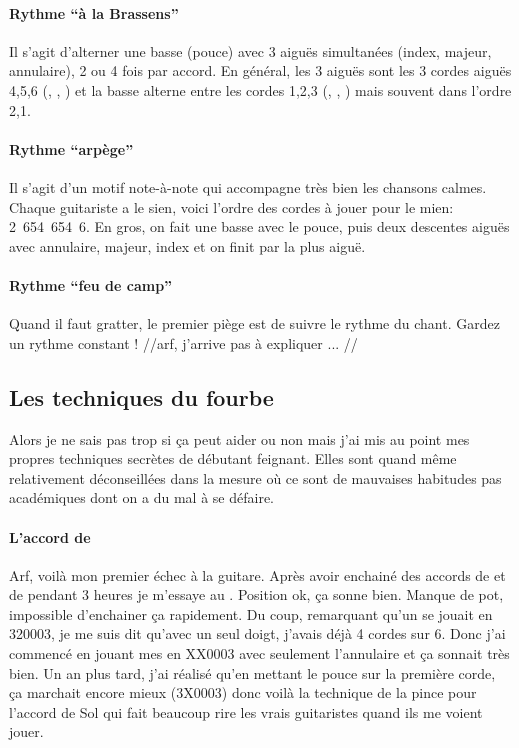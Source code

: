 \documentclass[versionenligne]{framabook}
\begin{document}
\paragraph{Rythme ``à la Brassens''} Il s'agit d'alterner une basse (pouce)
avec 3 aiguës simultanées (index, majeur, annulaire), 2 ou 4 fois par
accord. En général, les 3 aiguës sont les 3 cordes aiguës 4,5,6
(, , ) et la basse alterne entre
les cordes 1,2,3 (, , ) mais
souvent dans l'ordre 2,1.

\paragraph{Rythme ``arpège''} Il s'agit d'un motif note-à-note qui
accompagne très bien les chansons calmes. Chaque guitariste a le
sien, voici l'ordre des cordes à jouer pour le mien: 2~654~654~6. En
gros, on fait une basse avec le pouce, puis deux descentes aiguës avec
annulaire, majeur, index et on finit par la plus aiguë.

\paragraph{Rythme ``feu de camp''} Quand il faut gratter, le premier
piège est de suivre le rythme du chant. Gardez un rythme constant !
//arf, j'arrive pas à expliquer ... //


\subsection{Les techniques du fourbe}

Alors je ne sais pas trop si ça peut aider ou non mais j'ai mis au
point mes propres techniques secrètes de débutant feignant. Elles sont
quand même relativement déconseillées dans la mesure où ce sont de
mauvaises habitudes pas académiques dont on a du mal à se défaire.

\paragraph{L'accord de }
Arf, voilà mon premier échec à la guitare. Après avoir enchainé des
accords de  et de  pendant 3 heures je
m'essaye au . Position ok, ça sonne bien. Manque de pot,
impossible d'enchainer ça rapidement.  Du coup, remarquant qu'un
 se jouait en 320003, je me suis dit qu'avec un seul
doigt, j'avais déjà 4 cordes sur 6. Donc j'ai commencé en jouant mes
 en XX0003 avec seulement l'annulaire et ça sonnait très
bien. Un an plus tard, j'ai réalisé qu'en mettant le pouce sur la
première corde, ça marchait encore mieux (3X0003) donc voilà la
technique de la pince pour l'accord de Sol qui fait beaucoup rire les
vrais guitaristes quand ils me voient jouer.
\end{document}
